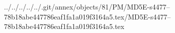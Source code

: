 ../../../../../.git/annex/objects/81/PM/MD5E-s4477--78b18abe447786eaf1fa1a019f3164a5.tex/MD5E-s4477--78b18abe447786eaf1fa1a019f3164a5.tex